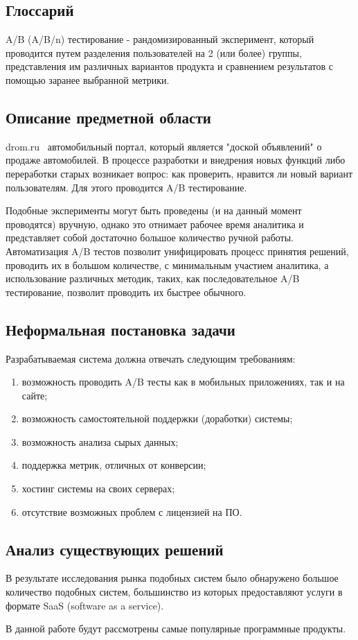 \documentclass[../document.tex]{subfiles}
\begin{document}
    \subsection{Глоссарий}
    \par A/B (A/B/n) тестирование - рандомизированный эксперимент, который проводится путем разделения пользователей на 2 (или более) группы, представления им различных вариантов продукта и сравнением результатов с помощью заранее выбранной метрики.
    \subsection{Описание предметной области}
    \par drom.ru \textemdash\ автомобильный портал, который является "доской объявлений" о продаже автомобилей. В процессе разработки и внедрения новых функций либо переработки старых возникает вопрос: как проверить, нравится ли новый вариант пользователям. Для этого проводится A/B тестирование.
    \par Подобные эксперименты могут быть проведены (и на данный момент проводятся) вручную, однако это отнимает рабочее время аналитика и представляет собой достаточно большое количество ручной работы. Автоматизация A/B тестов позволит унифицировать процесс принятия решений, проводить их в большом количестве, с минимальным участием аналитика, а использование различных методик, таких, как последовательное A/B тестирование, позволит проводить их быстрее обычного.
    \subsection{Неформальная постановка задачи}
    \par Разрабатываемая система должна отвечать следующим требованиям:
    \begin{enumerate}
        \item возможность проводить A/B тесты как в мобильных приложениях, так и на сайте;
        \item возможность самостоятельной поддержки (доработки) системы;
        \item возможность анализа сырых данных;
        \item поддержка метрик, отличных от конверсии;
        \item хостинг системы на своих серверах;
        \item отсутствие возможных проблем с лицензией на ПО.
    \end{enumerate}
    \subsection{Анализ существующих решений}
    \par В результате исследования рынка подобных систем было обнаружено большое количество подобных систем, большинство из которых предоставляют услуги в формате SaaS (software as a service).
    \par В данной работе будут рассмотрены самые популярные программные продукты.
\end{document}
